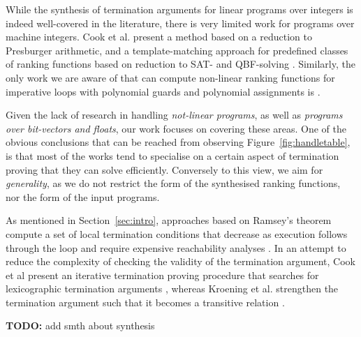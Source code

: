 \documentclass[preprint]{sigplanconf}
\theoremstyle{definition}
\newcommand{\todo}[1]{{\bf TODO:} #1}
\begin{document}
While the synthesis of termination arguments for linear programs over integers is indeed well-covered in the literature, 
there is very limited work for programs over machine integers.
Cook et al. present a method based on a reduction to Presburger
arithmetic, and a template-matching approach for predefined classes of
ranking functions based on reduction to SAT- and QBF-solving \cite{DBLP:conf/tacas/CookKRW10}.
Similarly, the only work we are aware of that can compute non-linear ranking functions  
for imperative loops with polynomial guards and polynomial assignments
is \cite{DBLP:conf/vmcai/BradleyMS05}.

Given the lack of research in handling \emph{not-linear programs}, as well as \emph{programs over bit-vectors and floats},  
our work focuses on covering these areas. 
One of the obvious conclusions that can be reached from observing Figure~\ref{fig:handletable}, 
is that most of the works tend to specialise on a certain aspect of termination proving that they can solve efficiently. 
Conversely to this view, we aim for \emph{generality}, as we do not restrict the form of the synthesised ranking functions, nor the form of the input programs.


As mentioned in Section~\ref{sec:intro}, approaches based on Ramsey's theorem compute a set of local termination conditions that decrease as execution follows through the loop
and require expensive reachability analyses
\cite{DBLP:conf/lpe/CodishG03,DBLP:conf/lics/PodelskiR04,DBLP:conf/pldi/CookPR06}.
In an attempt to reduce the complexity of checking the validity of the termination argument, 
Cook et al present an iterative termination proving procedure that searches for 
lexicographic termination arguments \cite{DBLP:conf/tacas/CookSZ13}, 
whereas Kroening et al. strengthen the termination argument such that it becomes a transitive relation \cite{DBLP:conf/cav/KroeningSTW10}.

\todo{add smth about synthesis}




\end{document}
